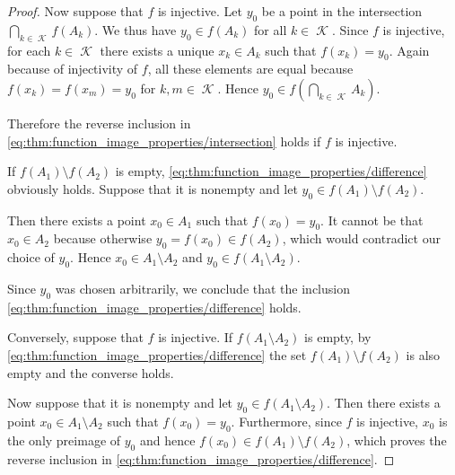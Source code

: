\begin{proof}
  Now suppose that \( f \) is injective. Let \( y_0 \) be a point in the intersection \( \bigcap_{k \in \mscrK} f(A_k) \). We thus have \( y_0 \in f(A_k) \) for all \( k \in \mscrK \). Since \( f \) is injective, for each \( k \in \mscrK \) there exists a unique \( x_k \in A_k \) such that \( f(x_k) = y_0 \). Again because of injectivity of \( f \), all these elements are equal because \( f(x_k) = f(x_m) = y_0 \) for \( k, m \in \mscrK \). Hence \( y_0 \in f(\bigcap_{k \in \mscrK} A_k) \).

  Therefore the reverse inclusion in \eqref{eq:thm:function_image_properties/intersection} holds if \( f \) is injective.

   If \( f(A_1) \setminus f(A_2) \) is empty, \eqref{eq:thm:function_image_properties/difference} obviously holds. Suppose that it is nonempty and let \( y_0 \in f(A_1) \setminus f(A_2) \).

  Then there exists a point \( x_0 \in A_1 \) such that \( f(x_0) = y_0 \). It cannot be that \( x_0 \in A_2 \) because otherwise \( y_0 = f(x_0) \in f(A_2) \), which would contradict our choice of \( y_0 \). Hence \( x_0 \in A_1 \setminus A_2 \) and \( y_0 \in f(A_1 \setminus A_2) \).

  Since \( y_0 \) was chosen arbitrarily, we conclude that the inclusion \eqref{eq:thm:function_image_properties/difference} holds.

  Conversely, suppose that \( f \) is injective. If \( f(A_1 \setminus A_2) \) is empty, by \eqref{eq:thm:function_image_properties/difference} the set \( f(A_1) \setminus f(A_2) \) is also empty and the converse holds.

  Now suppose that it is nonempty and let \( y_0 \in f(A_1 \setminus A_2) \). Then there exists a point \( x_0 \in A_1 \setminus A_2 \) such that \( f(x_0) = y_0 \). Furthermore, since \( f \) is injective, \( x_0 \) is the only preimage of \( y_0 \) and hence \( f(x_0) \in f(A_1) \setminus f(A_2) \), which proves the reverse inclusion in \eqref{eq:thm:function_image_properties/difference}.
\end{proof}


